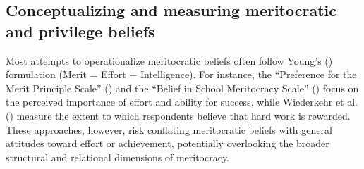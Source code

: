\documentclass[
  11pt,
]{article}
\begin{document}
\subsection{Conceptualizing and measuring meritocratic and privilege
beliefs}\label{conceptualizing-and-measuring-meritocratic-and-privilege-beliefs}

Most attempts to operationalize meritocratic beliefs often follow
Young's () formulation (Merit =
Effort + Intelligence). For instance, the ``Preference for the Merit
Principle Scale'' () and the ``Belief in School Meritocracy Scale''
() focus on the
perceived importance of effort and ability for success, while Wiederkehr
et al. () measure the extent
to which respondents believe that hard work is rewarded. These
approaches, however, risk conflating meritocratic beliefs with general
attitudes toward effort or achievement, potentially overlooking the
broader structural and relational dimensions of meritocracy.
\end{document}
